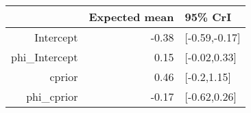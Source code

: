 \begin{tabular}{rrl}
  \hline
 & Expected mean & 95\% CrI \\ 
  \hline
Intercept & -0.38 & [-0.59,-0.17] \\ 
  phi\_Intercept & 0.15 & [-0.02,0.33] \\ 
  cprior & 0.46 & [-0.2,1.15] \\ 
  phi\_cprior & -0.17 & [-0.62,0.26] \\ 
   \hline
\end{tabular}

